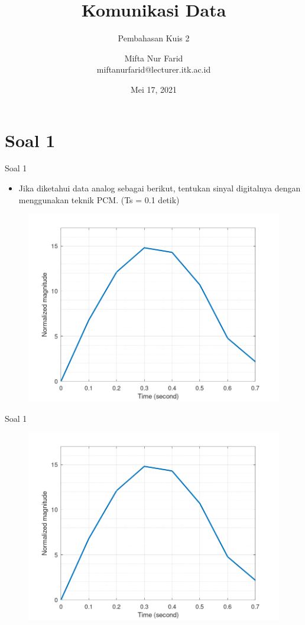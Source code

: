 \documentclass[aspectratio=169]{beamer}
\author{Mifta Nur Farid \\
	miftanurfarid@lecturer.itk.ac.id}
\title{Komunikasi Data}
\subtitle{Pembahasan Kuis 2}
\institute{Teknik Elektro \\ Institut Teknologi Kalimantan \\ Balikpapan, Indonesia}
\date{\tiny Mei 17, 2021}
\begin{document}
\begin{frame}[t,plain]
\titlepage
\end{frame}



\section{Soal 1}

\begin{frame}[t]{Soal 1}
	\begin{itemize}
		\item Jika diketahui data analog sebagai berikut, tentukan sinyal digitalnya dengan menggunakan teknik PCM. (Ts = 0.1 detik)
	\end{itemize}
	\begin{figure}
		\centering
		\includegraphics[width=0.5\linewidth]{../../../soal/kuis/soal1_kuis2}
	\end{figure}
\end{frame}

\begin{frame}[t]{Soal 1}
	\begin{figure}
		\centering
		\includegraphics[width=0.5\linewidth]{../../../soal/kuis/soal1_kuis2}
	\end{figure}
\end{frame}
\end{document}
